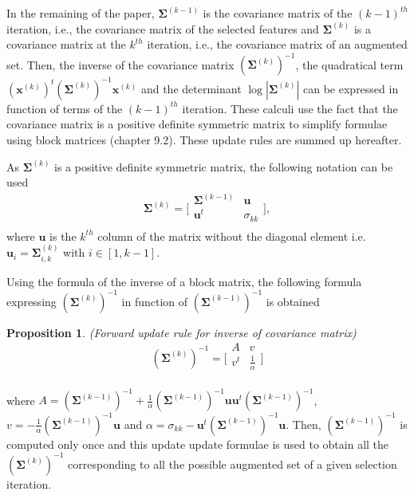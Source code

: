 \documentclass[journal,peerreview,onecolumn]{IEEEtran}
\newtheorem{prop}{Proposition}
\begin{document}
        In the remaining of the paper, $\boldsymbol{\Sigma}^{(k-1)}$ is the covariance matrix of the $(k-1)^{th}$ iteration, i.e., the covariance matrix of the selected features and $\boldsymbol{\Sigma}^{(k)}$ is a covariance matrix at the $k^{th}$ iteration, i.e., the covariance matrix of an augmented set. Then, the inverse of the covariance matrix $(\boldsymbol{\Sigma}^{(k)})^{-1}$, the quadratical term $(\mathbf{x}^{(k)})^t (\boldsymbol{\Sigma}^{(k)})^{-1} \mathbf{x}^{(k)}$ and the determinant $\log |\boldsymbol{\Sigma}^{(k)}|$ can be expressed in function of terms of the $(k-1)^{th}$ iteration. These calculi use the fact that the covariance matrix is a positive definite symmetric matrix to simplify formulae using block matrices \cite{webb2003statistical} (chapter 9.2). These update rules are summed up hereafter.

        As $\boldsymbol{\Sigma}^{(k)}$ is a positive definite symmetric matrix, the following notation can be used
        \begin{equation*}
            \boldsymbol{\Sigma}^{(k)} =
            \bigg[\begin{array}{cc}
            \boldsymbol{\Sigma}^{(k-1)} & \mathbf{u}      \\
            \mathbf{u}^t          & \sigma_{kk} \\
            \end{array}\bigg],
        \end{equation*}
        where $\mathbf{u}$ is the $k^{th}$ column of the matrix without the diagonal element i.e. $\mathbf{u}_{i} = \boldsymbol{\Sigma}^{(k)}_{i,k}$ with $i \in [1,k-1]$.

        Using the formula of the inverse of a block matrix, the following formula expressing $(\boldsymbol{\Sigma}^{(k)})^{-1}$ in function of $(\boldsymbol{\Sigma}^{(k-1)})^{-1}$ is obtained
        \begin{prop}
        \label{eq:update-inv}
            (Forward update rule for inverse of covariance matrix)
            \begin{equation*}
                (\boldsymbol{\Sigma}^{(k)})^{-1} =
                \bigg[\begin{array}{cc}
                A & v \\
                v^t  & \frac{1}{\alpha} \\
                \end{array}\bigg]
            \end{equation*}
        \end{prop}
        where $A = (\boldsymbol{\Sigma}^{(k-1)})^{-1} + \frac{1}{\alpha} (\boldsymbol{\Sigma}^{(k-1)})^{-1} \mathbf{u} \mathbf{u}^t (\boldsymbol{\Sigma}^{(k-1)})^{-1}$, $v = - \frac{1}{\alpha} (\boldsymbol{\Sigma}^{(k-1)})^{-1} \mathbf{u}$ and $ \alpha = \sigma_{kk} - \mathbf{u}^t (\boldsymbol{\Sigma}^{(k-1)})^{-1} \mathbf{u}$. Then, $(\boldsymbol{\Sigma}^{(k-1)})^{-1}$ is computed only once and this update update formulae is used to obtain all the $(\boldsymbol{\Sigma}^{(k)})^{-1}$ corresponding to all the possible augmented set of a given selection iteration.
\end{document}

